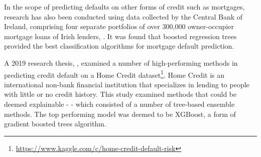 \documentclass[
]{article}
\begin{document}
In the scope of predicting defaults on other forms of credit such as
mortgages, research has also been conducted using data collected by the
Central Bank of Ireland, comprising four separate portfolios of over
300,000 owner-occupier mortgage loans of Irish lenders,
\citet{FITZPATRICK2016427}. It was found that boosted regression trees
provided the best classification algorithms for mortgage default
prediction. \vspace{.5 cm}

A 2019 research thesis, \citet{trap5146}, examined a number of
high-performing methods in predicting credit default on a Home Credit
dataset\footnote{\url{https://www.kaggle.com/c/home-credit-default-risk}}.
Home Credit is an international non-bank financial institution that
specializes in lending to people with little or no credit history. This
study examined methods that could be deemed explainable - - which
consisted of a number of tree-based ensemble methods. The top performing
model was deemed to be XGBoost, a form of gradient boosted trees
algorithm.
\end{document}
